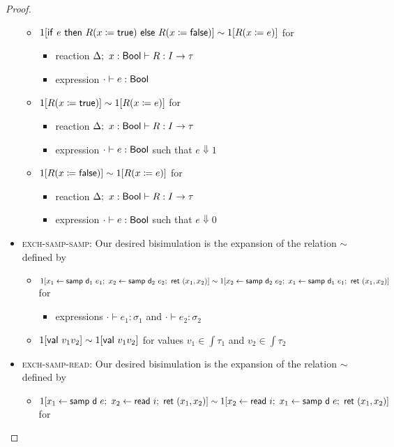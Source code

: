 \begin{proof}
\begin{itemize}
\begin{itemize}
\item $1[\mathsf{if} \ e \ \mathsf{then} \ R(x \coloneqq \mathsf{true}) \ \mathsf{else} \ R(x \coloneqq \mathsf{false})] \sim 1[R(x \coloneqq e)]$ for
\begin{itemize}
\item reaction $\Delta; \ x : \mathsf{Bool} \vdash R : I \to \tau$
\item expression $\cdot \vdash e : \mathsf{Bool}$
\end{itemize}
\item $1[R(x \coloneqq \mathsf{true})] \sim 1[R(x \coloneqq e)]$ for
\begin{itemize}
\item reaction $\Delta; \ x : \mathsf{Bool} \vdash R : I \to \tau$
\item expression $\cdot \vdash e : \mathsf{Bool}$ such that $e \Downarrow 1$
\end{itemize}
\item $1[R(x \coloneqq \mathsf{false})] \sim 1[R(x \coloneqq e)]$ for
\begin{itemize}
\item reaction $\Delta; \ x : \mathsf{Bool} \vdash R : I \to \tau$
\item expression $\cdot \vdash e : \mathsf{Bool}$ such that $e \Downarrow 0$
\end{itemize}
\end{itemize}
\item \textsc{exch-samp-samp}: Our desired bisimulation is the expansion of the relation $\sim$ defined by
\begin{itemize}
\item $1[x_1 \leftarrow \samp{\dist_1}{e_1}; \ x_2 \leftarrow \samp{\dist_2}{e_2}; \ \ret{(x_1,x_2)}] \sim \\ 1[x_2 \leftarrow \samp{\dist_2}{e_2}; \ x_1 \leftarrow \samp{\dist_1}{e_1}; \ \ret{(x_1,x_2)}]$ for
\begin{itemize}
\item expressions $\cdot \vdash e_1 : \sigma_1$ and $\cdot \vdash e_2 : \sigma_2$
\end{itemize}
\item $1[\mathsf{val} \ v_1 v_2] \sim 1[\mathsf{val} \ v_1 v_2]$ for values $v_1 \in \int{\tau_1}$ and $v_2 \in \int{\tau_2}$
\end{itemize}
\item \textsc{exch-samp-read}: Our desired bisimulation is the expansion of the relation $\sim$ defined by
\begin{itemize}
\item $1[x_1 \leftarrow \samp{\dist}{e}; \ x_2 \leftarrow \read{i}; \ \ret{(x_1,x_2)}] \sim 1[x_2 \leftarrow \read{i}; \ x_1 \leftarrow \samp{\dist}{e}; \ \ret{(x_1,x_2)}]$ for

\end{itemize}
\end{itemize}
\end{proof}
